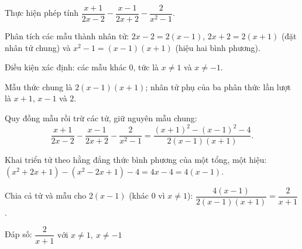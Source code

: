 \begin{problem}[8DS-PS-005]
Thực hiện phép tính $\dfrac{x + 1}{2x - 2} - \dfrac{x - 1}{2x + 2} - \dfrac{2}{x^2 - 1}$.

\begin{solution}
Phân tích các mẫu thành nhân tử: $2x - 2 = 2(x - 1)$, $2x + 2 = 2(x + 1)$ (đặt nhân tử chung) và $x^2 - 1 = (x - 1)(x + 1)$ (hiệu hai bình phương).

Điều kiện xác định: các mẫu khác $0$, tức là $x \neq 1$ và $x \neq -1$.

Mẫu thức chung là $2(x - 1)(x + 1)$; nhân tử phụ của ba phân thức lần lượt là $x + 1$, $x - 1$ và $2$.

Quy đồng mẫu rồi trừ các tử, giữ nguyên mẫu chung:
\[ \dfrac{x + 1}{2x - 2} - \dfrac{x - 1}{2x + 2} - \dfrac{2}{x^2 - 1} = \dfrac{(x + 1)^2 - (x - 1)^2 - 4}{2(x - 1)(x + 1)}. \]

Khai triển tử theo hằng đẳng thức bình phương của một tổng, một hiệu: $(x^2 + 2x + 1) - (x^2 - 2x + 1) - 4 = 4x - 4 = 4(x - 1)$.

Chia cả tử và mẫu cho $2(x - 1)$ (khác $0$ vì $x \neq 1$): $\dfrac{4(x - 1)}{2(x - 1)(x + 1)} = \dfrac{2}{x + 1}$.

Đáp số: $\boxed{\dfrac{2}{x + 1} \text{ với } x \neq 1,\ x \neq -1}$
\end{solution}
\end{problem}

